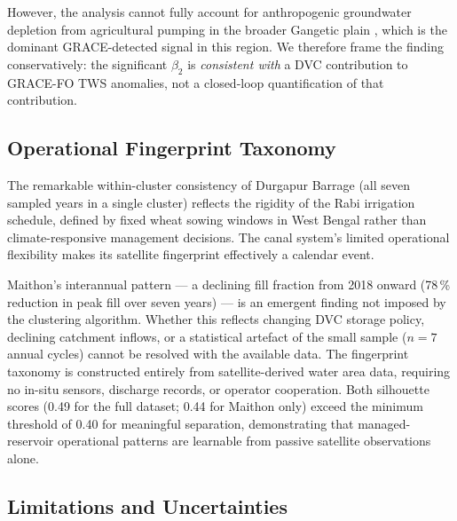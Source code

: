 \documentclass[preprint,12pt,authoryear]{elsarticle}
\begin{document}
However, the analysis cannot fully account for anthropogenic groundwater
depletion from agricultural pumping in the broader Gangetic plain
\citep{Rodell2009}, which is the dominant GRACE-detected signal in this
region. We therefore frame the finding conservatively: the significant
$\beta_2$ is \textit{consistent with} a DVC contribution to GRACE-FO TWS
anomalies, not a closed-loop quantification of that contribution.

\subsection{Operational Fingerprint Taxonomy}
\label{sec:disc_taxonomy}

The remarkable within-cluster consistency of Durgapur Barrage (all seven
sampled years in a single cluster) reflects the rigidity of the Rabi
irrigation schedule, defined by fixed wheat sowing windows in West Bengal
rather than climate-responsive management decisions. The canal system's limited
operational flexibility makes its satellite fingerprint effectively a calendar
event.

Maithon's interannual pattern --- a declining fill fraction from 2018 onward
(78\,\% reduction in peak fill over seven years) --- is an emergent finding
not imposed by the clustering algorithm. Whether this reflects changing DVC
storage policy, declining catchment inflows, or a statistical artefact of the
small sample ($n = 7$ annual cycles) cannot be resolved with the available
data. The fingerprint taxonomy is constructed entirely from satellite-derived
water area data, requiring no in-situ sensors, discharge records, or operator
cooperation. Both silhouette scores (0.49 for the full dataset; 0.44 for
Maithon only) exceed the minimum threshold of 0.40 for meaningful separation,
demonstrating that managed-reservoir operational patterns are learnable from
passive satellite observations alone.

\subsection{Limitations and Uncertainties}
\label{sec:disc_limitations}
\end{document}
